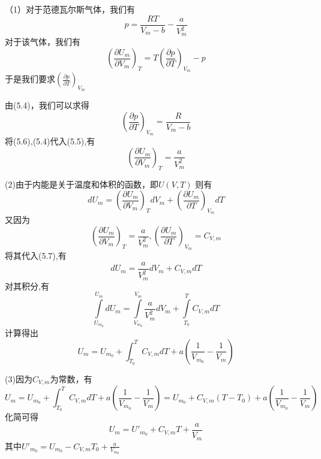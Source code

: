 \documentclass[lang=cn,10pt]{elegantbook}
\begin{document}
	\begin{solution}
		
		（1）对于范德瓦尔斯气体，我们有
		\begin{equation}
			p=\frac{RT}{V_m-b}-\frac{a}{V_{m}^{2}}
		\end{equation}
		对于该气体，我们有
		\begin{equation}
			\left( \frac{\partial U_{m}}{\partial V_{m}} \right) _T=T\left( \frac{\partial p}{\partial T} \right) _{V_{m}}-p
		\end{equation}
		于是我们要求$\left( \frac{\partial p}{\partial T} \right) _{V_{m}}$
		
		由(5.4)，我们可以求得
		\begin{equation}
			\left( \frac{\partial p}{\partial T} \right) _{V_{m}}=\frac{R}{V_m-b}
		\end{equation}
		将(5.6),(5.4)代入(5.5),有
		\begin{equation*}
			\left( \frac{\partial U_m}{\partial V_m} \right) _T=\frac{a}{V_{m}^{2}}
		\end{equation*}
		
		(2)由于内能是关于温度和体积的函数，即$U(V,T)$
		则有
		\begin{equation}
			dU_m=\left( \frac{\partial U_m}{\partial V_m} \right) _TdV_m+\left( \frac{\partial U_m}{\partial T} \right) _{V_m}dT
		\end{equation}
		又因为
		\begin{equation}
			\left( \frac{\partial U_m}{\partial V_m} \right) _T=\frac{a}{V_{m}^{2}},\left( \frac{\partial U_m}{\partial T} \right) _{V_m}=C_{V,m}
		\end{equation}
		将其代入(5.7),有
		\begin{equation*}
			dU_m=\frac{a}{V_{m}^{2}}dV_m+C_{V,m}dT
		\end{equation*}
		对其积分,有
		\begin{equation*}
			\int\limits_{U_{m_0}}^{U_m}{}dU_m=\int\limits_{V_{m_0}}^{V_m}{}\frac{a}{V_{m}^{2}}dV_m+\int\limits_{T_0}^T{}C_{V,m}dT
		\end{equation*}
		计算得出
		\begin{equation*}
			U_m=U_{m_0}+\int_{T_0}^T{C_{V,m}dT}+a\left( \frac{1}{V_{m_0}}-\frac{1}{V_m} \right) 
		\end{equation*}
		
		(3)因为$C_{V,m}$为常数，有
		\begin{equation*}
				U_m=U_{m_0}+\int_{T_0}^T{C_{V,m}dT}+a\left( \frac{1}{V_{m_0}}-\frac{1}{V_m} \right)=U_{m_0}+C_{V,m}(T-T_{0})+a\left( \frac{1}{V_{m_0}}-\frac{1}{V_m} \right)
		\end{equation*}
		化简可得
		\begin{equation*}
			U_m=U\prime_{m_0}+C_{V,m}T+\frac{a}{V_m}
		\end{equation*}
		其中$U\prime_{m_0}=U_{m_0}-C_{V,m}T_{0}+\frac{a}{V_{m_{0}}}$
	\end{solution}
\end{document}
